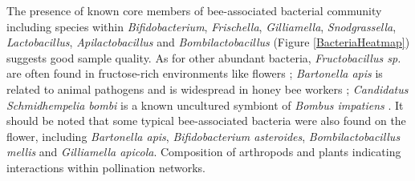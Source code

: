 \documentclass[11pt]{article}
\begin{document}
    The presence of known core members of bee-associated bacterial community including species within \textit{Bifidobacterium}, \textit{Frischella}, \textit{Gilliamella}, \textit{Snodgrassella}, \textit{Lactobacillus}, \textit{Apilactobacillus} and \textit{Bombilactobacillus} (Figure \ref{BacteriaHeatmap}) \citep{koch2011bacterial,moran2015genomics,kwong2017dynamic,zheng2020taxonomic} suggests good sample quality. 
    As for other abundant bacteria, \textit{Fructobacillus sp.} are often found in fructose-rich environments like flowers \citep{endo2014genus}; \textit{Bartonella apis} is related to animal pathogens \citep{kevsnerova2016bartonella} and is widespread in honey bee workers \citep{raymann2018role}; \textit{Candidatus Schmidhempelia bombi} is a known uncultured symbiont of \textit{Bombus impatiens} \citep{martinson2014genomic}. 
    It should be noted that some typical bee-associated bacteria were also found on the flower, including \textit{Bartonella apis}, \textit{Bifidobacterium asteroides}, \textit{Bombilactobacillus mellis} and \textit{Gilliamella apicola}. 
    \newline
    Composition of arthropods and plants indicating interactions within pollination networks. 
\end{document}
